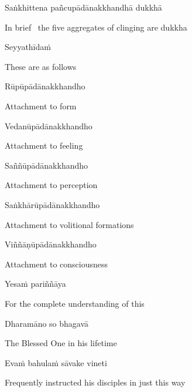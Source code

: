 Saṅkhittena pañcupādānakkhandhā dukkhā

\begin{english}
  In brief \breathmark\ the five aggregates of clinging are dukkha
\end{english}

Seyyathīdaṁ

\begin{english}
  These are as follows
\end{english}

Rūpūpādānakkhandho

\begin{english}
  Attachment to form
\end{english}

Vedanūpādānakkhandho

\begin{english}
  Attachment to feeling
\end{english}

Saññūpādānakkhandho

\begin{english}
  Attachment to perception
\end{english}

Saṅkhārūpādānakkhandho

\begin{english}
  Attachment to volitional formations
\end{english}

Viññāṇūpādānakkhandho

\begin{english}
  Attachment to consciousness
\end{english}

Yesaṁ pariññāya

\begin{english}
  For the complete understanding of this
\end{english}

Dharamāno so bhagavā

\begin{english}
  The Blessed One in his lifetime
\end{english}

Evaṁ bahulaṁ sāvake vineti

\begin{english}
  Frequently instructed his disciples in just this way
\end{english}

